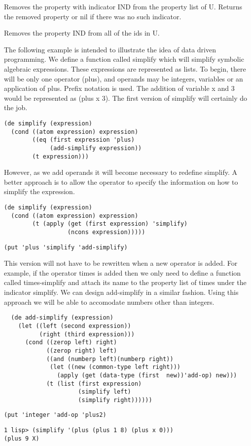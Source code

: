 {    Removes  the  property  with indicator IND from the property
    list of U.  Returns the removed property or nil if there was
    no such indicator.
}

{    Removes the property IND from all of the ids in U.
}

\noindent
The following example is intended to illustrate  the  idea  of
data  driven  programming.  We define a function called simplify
which will  simplify  symbolic  algebraic  expressions.    These
expressions  are  represented as lists.  To begin, there will be
only  one  operator  (plus),  and  operands  may  be   integers,
variables  or  an application of plus.  Prefix notation is used.
The addition of variable x and 3 would be represented as (plus x
3).  The first version of simplify will certainly do the job.

\begin{verbatim}
(de simplify (expression)
  (cond ((atom expression) expression)
        ((eq (first expression 'plus)
             (add-simplify expression))
        (t expression)))
\end{verbatim}
However, as we  add  operands  it  will  become  necessary  to
redefine  simplify.   A better approach is to allow the operator
to specify the information on how to simplify the expression.

\begin{verbatim}
(de simplify (expression)
  (cond ((atom expression) expression)
        (t (apply (get (first expression) 'simplify)
                  (ncons expression)))))
\end{verbatim}
\begin{verbatim}
(put 'plus 'simplify 'add-simplify)
\end{verbatim}
This version will not have to be rewritten when a new operator
is added.  For example, if the operator times is added  then  we
only  need to define a function called times-simplify and attach
its name to the property  list  of  times  under  the  indicator
simplify.    We  can  design  add-simplify in a similar fashion.
Using this approach we will be able to accomodate numbers  other
than integers.

\begin{verbatim}
  (de add-simplify (expression)
    (let ((left (second expression))
          (right (third expression)))
      (cond ((zerop left) right)
            ((zerop right) left)
            ((and (numberp left)(numberp right))
             (let ((new (common-type left right)))
               (apply (get (data-type (first  new))'add-op) new)))
            (t (list (first expression)
                     (simplify left)
                     (simplify right))))))
\end{verbatim}
\begin{verbatim}
(put 'integer 'add-op 'plus2)
\end{verbatim}
\begin{verbatim}
1 lisp> (simplify '(plus (plus 1 8) (plus x 0)))
(plus 9 X)
\end{verbatim}

